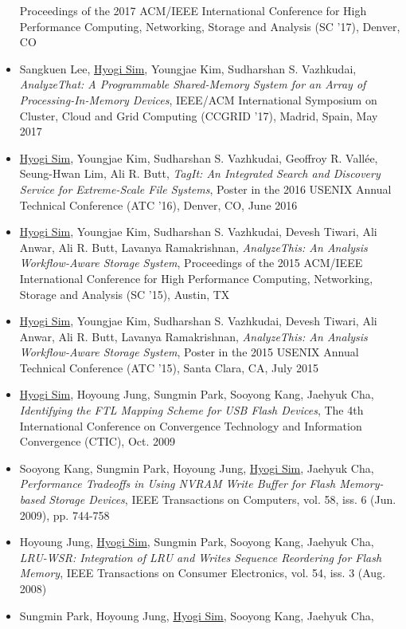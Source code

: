 \begin{itemize}
  Proceedings of the 2017 ACM/IEEE International Conference for High
  Performance Computing, Networking, Storage and Analysis (SC '17), Denver, CO
\item Sangkuen Lee, \underline{Hyogi Sim}, Youngjae Kim,
  Sudharshan S. Vazhkudai,
  {\it AnalyzeThat: A Programmable Shared-Memory System for an Array of Processing-In-Memory Devices},
  IEEE/ACM International Symposium on Cluster, Cloud and Grid Computing
  (CCGRID '17), Madrid, Spain, May 2017
\item \underline{Hyogi Sim}, Youngjae Kim, Sudharshan S. Vazhkudai,
  Geoffroy R. Vall\'ee, Seung-Hwan Lim, Ali R. Butt,
  {\it TagIt: An Integrated Search and Discovery Service for Extreme-Scale File
  Systems},
  Poster in the 2016 USENIX Annual Technical Conference (ATC '16),
  Denver, CO, June 2016 %
\item \underline{Hyogi Sim}, Youngjae Kim, Sudharshan S. Vazhkudai,
  Devesh Tiwari, Ali Anwar, Ali R. Butt, Lavanya Ramakrishnan,
  {\it AnalyzeThis: An Analysis Workflow-Aware Storage System},
  Proceedings of the 2015 ACM/IEEE International Conference for High
  Performance Computing, Networking, Storage and Analysis (SC '15), Austin, TX
\item \underline{Hyogi Sim}, Youngjae Kim, Sudharshan S. Vazhkudai,
  Devesh Tiwari, Ali Anwar, Ali R. Butt, Lavanya Ramakrishnan,
  {\it AnalyzeThis: An Analysis Workflow-Aware Storage System},
  Poster in the 2015 USENIX Annual Technical Conference (ATC '15),
  Santa Clara, CA, July 2015
\item \underline{Hyogi Sim}, Hoyoung Jung, Sungmin Park, Sooyong Kang, Jaehyuk Cha,
  {\it Identifying the FTL Mapping Scheme for USB Flash Devices},
  The 4th International Conference on Convergence Technology
  and Information Convergence (CTIC), Oct. 2009 %
\item Sooyong Kang, Sungmin Park, Hoyoung Jung, \underline{Hyogi Sim}, Jaehyuk Cha,
  {\it Performance Tradeoffs in Using NVRAM Write Buffer for Flash Memory-based
  Storage Devices},
  IEEE Transactions on Computers, vol. 58, iss. 6 (Jun. 2009), pp. 744-758
\item Hoyoung Jung, \underline{Hyogi Sim}, Sungmin Park, Sooyong Kang, Jaehyuk Cha,
 {\it LRU-WSR: Integration of LRU and Writes Sequence Reordering for Flash
 Memory},
 IEEE Transactions on Consumer Electronics, vol. 54, iss. 3 (Aug. 2008)
\item Sungmin Park, Hoyoung Jung, \underline{Hyogi Sim}, Sooyong Kang, Jaehyuk Cha,

\end{itemize}

